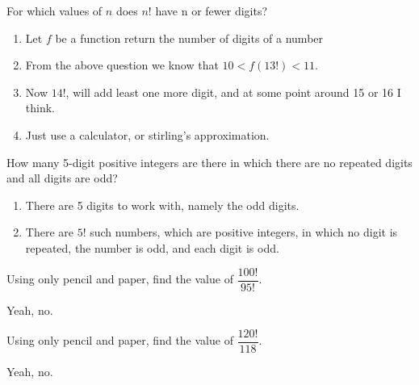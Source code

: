 \documentclass[openany, 11pt]{book}
\begin{document}
\begin{exercise}{}{}
	For which values of $n$ does $n!$ have n or fewer digits?
	\begin{enumerate}[label={\textbullet}, leftmargin=*, itemsep=0pt, parsep=0pt]
		\item Let $f$ be a function return the number of digits of a number
		\item From the above question we know that $10 < f(13!) < 11$.
		\item Now $14!$, will add least one more digit, and at some point around
		      15 or 16 I think.
		\item Just use a calculator, or stirling's approximation.
	\end{enumerate}
\end{exercise}

\begin{exercise}{}{}
	How many 5-digit positive integers are there in which there are no repeated
	digits and all digits are odd?
	\begin{enumerate}[label={\textbullet}, leftmargin=*, itemsep=0pt, parsep=0pt]
		\item There are 5 digits to work with, namely the odd digits.
		\item There are $5!$ such numbers, which are positive integers, in which
		      no digit is repeated, the number is odd, and each digit is odd.
	\end{enumerate}
\end{exercise}

\begin{exercise}{}{}
	Using only pencil and paper, find the value of $\dfrac{100!}{95!}$.

	Yeah, no.
\end{exercise}

\begin{exercise}{}{}
	Using only pencil and paper, find the value of $\dfrac{120!}{118}$.

	Yeah, no.
\end{exercise}
\end{document}
